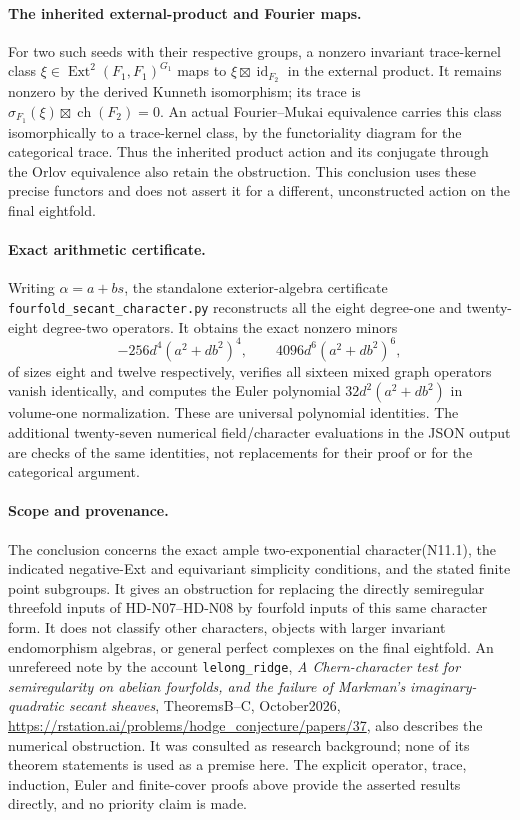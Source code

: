 \paragraph{The inherited external-product and Fourier maps.}
For two such seeds with their respective groups, a nonzero
invariant trace-kernel class $\xi\in\operatorname{Ext}^2(F_1,F_1)^{G_1}$
maps to $\xi\boxtimes\operatorname{id}_{F_2}$ in the external
product. It remains nonzero by the derived Kunneth isomorphism;
its trace is $\sigma_{F_1}(\xi)\boxtimes\operatorname{ch}(F_2)=0$.
An actual Fourier--Mukai equivalence carries this class
isomorphically to a trace-kernel class, by the functoriality
diagram for the categorical trace. Thus the inherited product
action and its conjugate through the Orlov equivalence also
retain the obstruction. This conclusion uses these precise
functors and does not assert it for a different, unconstructed
action on the final eightfold.

\paragraph{Exact arithmetic certificate.}
Writing $\alpha=a+bs$, the standalone exterior-algebra certificate
\texttt{fourfold\_secant\_character.py} reconstructs all the
eight degree-one and twenty-eight degree-two operators.
It obtains the exact nonzero minors
\[
 -256d^4(a^2+db^2)^4,\qquad
 4096d^6(a^2+db^2)^6,
\]
of sizes eight and twelve respectively, verifies all sixteen
mixed graph operators vanish identically, and computes the
Euler polynomial $32d^2(a^2+db^2)$ in volume-one normalization.
These are universal polynomial identities. The additional
twenty-seven numerical field/character evaluations in the
JSON output are checks of the same identities, not replacements
for their proof or for the categorical argument.

\paragraph{Scope and provenance.}
The conclusion concerns the exact ample two-exponential
character(N11.1), the indicated negative-Ext and equivariant
simplicity conditions, and the stated finite point subgroups.
It gives an obstruction for replacing the directly semiregular
threefold inputs of HD-N07--HD-N08 by fourfold inputs of this
same character form. It does not classify other characters,
objects with larger invariant endomorphism algebras, or general
perfect complexes on the final eightfold.
An unrefereed note by the account \texttt{lelong\_ridge},
\emph{A Chern-character test for semiregularity on abelian
fourfolds, and the failure of Markman's imaginary-quadratic
secant sheaves}, TheoremsB--C, October2026,
\url{https://rstation.ai/problems/hodge_conjecture/papers/37},
also describes the numerical obstruction. It was consulted as
research background; none of its theorem statements is used
as a premise here. The explicit operator, trace, induction,
Euler and finite-cover proofs above provide the asserted
results directly, and no priority claim is made.
